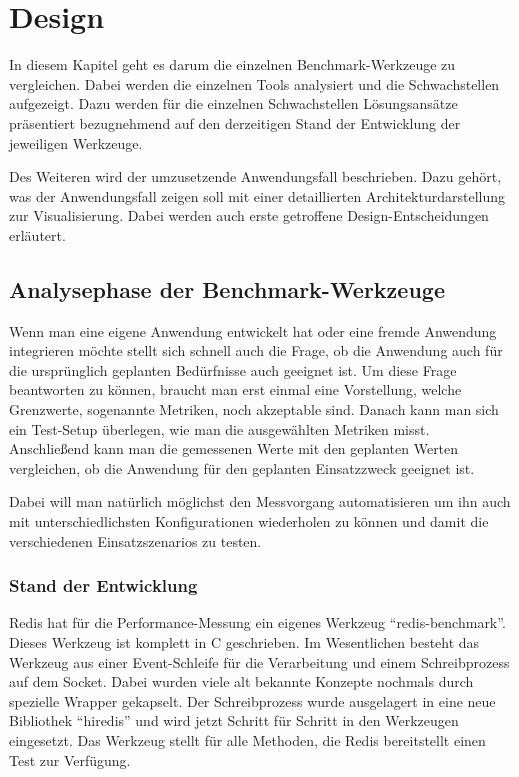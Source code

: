 \chapter{Design}
In diesem Kapitel geht es darum die einzelnen Benchmark-Werkzeuge zu
vergleichen. Dabei werden die einzelnen Tools analysiert und die Schwachstellen
aufgezeigt. Dazu werden für die einzelnen Schwachstellen Lösungsansätze
präsentiert bezugnehmend auf den derzeitigen Stand der Entwicklung der
jeweiligen Werkzeuge.

Des Weiteren wird der umzusetzende Anwendungsfall beschrieben. Dazu gehört, was
der Anwendungsfall zeigen soll mit einer detaillierten Architekturdarstellung
zur Visualisierung. Dabei werden auch erste getroffene Design-Entscheidungen
erläutert.

\section{Analysephase der Benchmark-Werkzeuge}
Wenn man eine eigene Anwendung entwickelt hat oder eine fremde Anwendung
integrieren möchte stellt sich schnell auch die Frage, ob die Anwendung auch für
die ursprünglich geplanten Bedürfnisse auch geeignet ist. Um diese Frage
beantworten zu können, braucht man erst einmal eine Vorstellung, welche
Grenzwerte, sogenannte Metriken, noch akzeptable sind. Danach kann man sich ein
Test-Setup überlegen, wie man die ausgewählten Metriken misst. Anschließend kann
man die gemessenen Werte mit den geplanten Werten vergleichen, ob die Anwendung
für den geplanten Einsatzzweck geeignet ist.


Dabei will man natürlich möglichst den Messvorgang automatisieren um ihn auch
mit unterschiedlichsten Konfigurationen wiederholen zu können und damit die
verschiedenen Einsatzszenarios zu testen.

\subsection{Stand der Entwicklung}
Redis hat für die Performance-Messung ein eigenes Werkzeug
\enquote{redis-benchmark}. Dieses Werkzeug ist komplett in C geschrieben. Im
Wesentlichen besteht das Werkzeug aus einer Event-Schleife für die Verarbeitung
und einem Schreibprozess auf dem Socket. Dabei wurden viele alt bekannte
Konzepte nochmals durch spezielle Wrapper gekapselt. Der Schreibprozess wurde
ausgelagert in eine neue Bibliothek \enquote{hiredis} und wird jetzt Schritt für
Schritt in den Werkzeugen eingesetzt. Das Werkzeug stellt für alle Methoden,
die Redis bereitstellt einen Test zur Verfügung.

